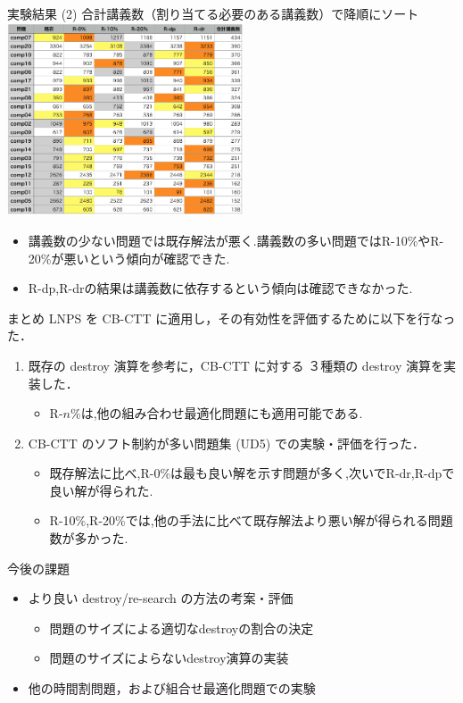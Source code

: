 \documentclass[11pt,dvipdfmx]{beamer}
\begin{document}
\begin{frame}{実験結果 (2)}
 \scriptsize 合計講義数（割り当てる必要のある講義数）で降順にソート
  \centering
  \includegraphics[width=7cm]{pic/lecture_sort.png}
  \begin{itemize}
  \item \small 講義数の少ない問題では既存解法が悪く.講義数の多い問題ではR-10\%やR-20\%が悪いという傾向が確認できた.
 \item \small R-dp,R-drの結果は講義数に依存するという傾向は確認できなかった.
  \end{itemize}
\end{frame}
\begin{frame}{まとめ}
  \small LNPS を CB-CTT に適用し，その有効性を評価するために以下を行なった．
  \begin{enumerate}
  \item \small 既存の destroy 演算を参考に，CB-CTT に対する ３種類の destroy
    演算を実装した．
    \begin{itemize}
    \item \footnotesize R-$n$\%は,他の組み合わせ最適化問題にも適用可能である.
    \end{itemize}
  \item \small CB-CTT のソフト制約が多い問題集 (UD5) での実験・評価を行った．
    \begin{itemize}
    \item \footnotesize 既存解法に比べ,R-0\%は最も良い解を示す問題が多く,次いでR-dr,R-dpで良い解が得られた.
   \item \footnotesize R-10\%,R-20\%では,他の手法に比べて既存解法より悪い解が得られる問題数が多かった.
    \end{itemize}
  \end{enumerate}
    
  \begin{alertblock}{\small 今後の課題}
    \begin{itemize}
    \item \small より良い destroy/re-search の方法の考案・評価
    \begin{itemize}
    \item \footnotesize 問題のサイズによる適切なdestroyの割合の決定
   \item \footnotesize 問題のサイズによらないdestroy演算の実装
    \end{itemize}
    \item 他の時間割問題，および組合せ最適化問題での実験
    \end{itemize}
  \end{alertblock}
\end{frame}
\end{document}
